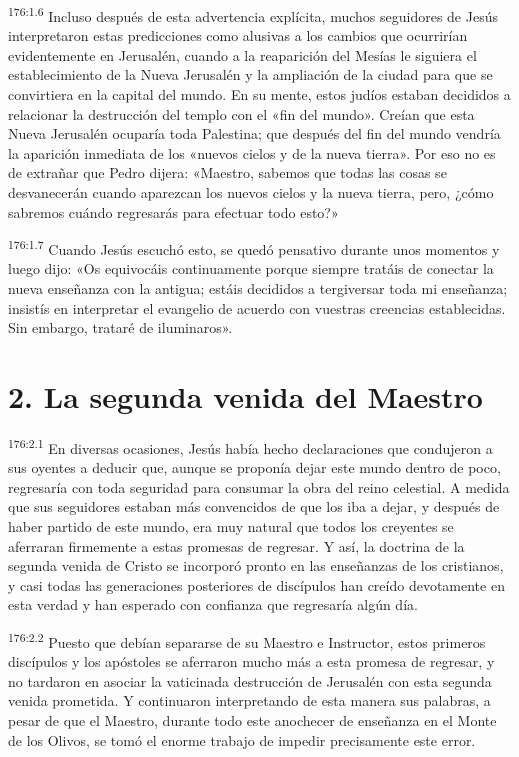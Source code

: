 \par 
\textsuperscript{176:1.6} Incluso después de esta advertencia explícita, muchos seguidores de Jesús interpretaron estas predicciones como alusivas a los cambios que ocurrirían evidentemente en Jerusalén, cuando a la reaparición del Mesías le siguiera el establecimiento de la Nueva Jerusalén y la ampliación de la ciudad para que se convirtiera en la capital del mundo. En su mente, estos judíos estaban decididos a relacionar la destrucción del templo con el «fin del mundo». Creían que esta Nueva Jerusalén ocuparía toda Palestina; que después del fin del mundo vendría la aparición inmediata de los «nuevos cielos y de la nueva tierra». Por eso no es de extrañar que Pedro dijera: «Maestro, sabemos que todas las cosas se desvanecerán cuando aparezcan los nuevos cielos y la nueva tierra, pero, ¿cómo sabremos cuándo regresarás para efectuar todo esto?»

\par 
\textsuperscript{176:1.7} Cuando Jesús escuchó esto, se quedó pensativo durante unos momentos y luego dijo: «Os equivocáis continuamente porque siempre tratáis de conectar la nueva enseñanza con la antigua; estáis decididos a tergiversar toda mi enseñanza; insistís en interpretar el evangelio de acuerdo con vuestras creencias establecidas. Sin embargo, trataré de iluminaros».

\section*{2. La segunda venida del Maestro}
\par 
\textsuperscript{176:2.1} En diversas ocasiones, Jesús había hecho declaraciones que condujeron a sus oyentes a deducir que, aunque se proponía dejar este mundo dentro de poco, regresaría con toda seguridad para consumar la obra del reino celestial. A medida que sus seguidores estaban más convencidos de que los iba a dejar, y después de haber partido de este mundo, era muy natural que todos los creyentes se aferraran firmemente a estas promesas de regresar. Y así, la doctrina de la segunda venida de Cristo se incorporó pronto en las enseñanzas de los cristianos, y casi todas las generaciones posteriores de discípulos han creído devotamente en esta verdad y han esperado con confianza que regresaría algún día.

\par 
\textsuperscript{176:2.2} Puesto que debían separarse de su Maestro e Instructor, estos primeros discípulos y los apóstoles se aferraron mucho más a esta promesa de regresar, y no tardaron en asociar la vaticinada destrucción de Jerusalén con esta segunda venida prometida. Y continuaron interpretando de esta manera sus palabras, a pesar de que el Maestro, durante todo este anochecer de enseñanza en el Monte de los Olivos, se tomó el enorme trabajo de impedir precisamente este error.

